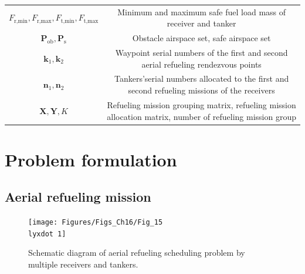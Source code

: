 \begin{table}
\begin{centering}
\begin{tabular}{|c|c|}
			$F_{\text{r,min}},F_{\text{r,max}},F_{\text{t,min}},F_{\text{t,max}}$ & Minimum and maximum safe fuel load mass of receiver and tanker\tabularnewline
			
			
			$\mathbf{P}_{\text{ob}},\mathbf{P}_{\text{s}}$ & Obstacle airspace set, safe airspace set\tabularnewline
			$\mathbf{k}_{\text{1}},\mathbf{k}_{\text{2}}$ & Waypoint serial numbers of the first and second aerial refueling rendezvous points\tabularnewline
			
			$\mathbf{n}_{\text{1}},\mathbf{n}_{\text{2}}$ & Tankers'serial numbers allocated to the first and second refueling missions of the receivers\tabularnewline
			
			$\mathbf{X},\mathbf{Y},K$ & Refueling mission grouping matrix, refueling mission allocation matrix, number of refueling mission group\tabularnewline
			
			\hline 
		\end{tabular}
		\par\end{centering}
	\centering{}\label{Tab_15.1}
\end{table}



\section{Problem formulation}\label{sec_2}

\subsection{Aerial refueling mission}

\begin{figure}
	\begin{centering}
		\texttt{[image: Figures/Figs\_Ch16/Fig\_15\\lyxdot 1]}
		\par\end{centering}
	\caption{Schematic diagram of aerial refueling scheduling problem by multiple receivers and tankers.}
	
	\centering{}\label{Fig_15.1}
\end{figure}

